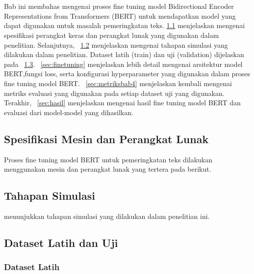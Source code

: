 \chapter{\babEmpat}
\label{bab:4}

Bab ini membahas mengenai proses fine tuning model Bidirectional Encoder Representations from Transformers (BERT) untuk mendapatkan model yang dapat digunakan untuk masalah pemeringkatan teks.
\sect\ref{sec:spesifikasi} menjelaskan mengenai spesifikasi perangkat keras dan perangkat lunak yang digunakan dalam penelitian. Selanjutnya, \sect~\ref{sec:simulasi} menjelaskan mengenai tahapan simulasi yang dilakukan dalam penelitian. Dataset latih (train) dan uji (validation) dijelaskan pada \sect~\ref{sec:dataset}. \sect~\ref{sec:finetuning} menjelaskan lebih detail mengenai arsitektur model BERT,fungsi loss, serta konfigurasi hyperparameter yang digunakan dalam proses fine tuning model BERT. \sect~\ref{sec:metriksbab4} menjelaskan kembali mengenai metriks evaluasi yang digunakan pada setiap dataset uji yang digunakan. Terakhir, \sect~\ref{sec:hasil} menjelaskan mengenai hasil fine tuning model BERT dan evaluasi dari model-model yang dihasilkan.


\section{Spesifikasi Mesin dan Perangkat Lunak}
\label{sec:spesifikasi}

\noindent{}

Proses fine tuning model BERT untuk pemeringkatan teks dilakukan menggunakan mesin dan perangkat lunak yang tertera pada  berikut.


\section{Tahapan Simulasi}
\label{sec:simulasi}

menunjukkan tahapan simulasi yang dilakukan dalam penelitian ini.




\section{Dataset Latih dan Uji}
\label{sec:dataset}

\subsection{Dataset Latih}
\label{sec:datasetlatih}

